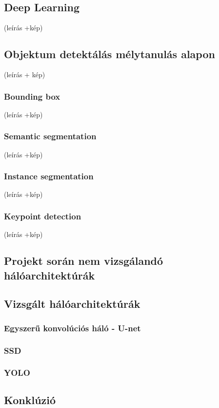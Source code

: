\documentclass{article}
\begin{document}
\subsection{Deep Learning}
(leírás +kép)
\subsection{Objektum detektálás mélytanulás alapon}
(leírás + kép)
\subsubsection{Bounding box}
(leírás +kép)
\subsubsection{Semantic segmentation}
(leírás +kép)
\subsubsection{Instance segmentation}
(leírás +kép)
\subsubsection{Keypoint detection}
(leírás +kép)

\subsection{Projekt során nem vizsgálandó hálóarchitektúrák}

\subsection{Vizsgált hálóarchitektúrák}
\subsubsection{Egyszerű konvolúciós háló - U-net}

\subsubsection{SSD}

\subsubsection{YOLO}

\subsection{Konklúzió}
\end{document}
